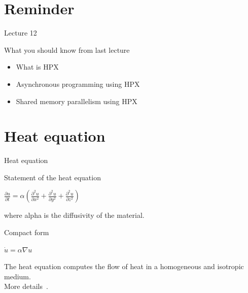 \documentclass[12pt,t]{beamer}
\title{\coursename}
\subtitle{Lecture 12: One-dimensional heat equation}
\date {
 \tiny \url{\courseurl}
\vspace{2cm}
\doclicenseThis  
  
}
\begin{document}
 {
    \frame {
        \titlepage
    }
}

\frame{

\tableofcontents

}


\section{Reminder}
\begin{frame}{Lecture 12}
\begin{block}{What you should know from last lecture}
\begin{itemize}
\item What is HPX
\item Asynchronous programming using HPX
\item Shared memory parallelism using HPX
\end{itemize}
\end{block}
\end{frame}

\section{Heat equation}

\begin{frame}{Heat equation}

\begin{block}{Statement of the heat equation}
\begin{center}
$\frac{\partial u}{\partial t} = \alpha \left( \frac{\partial^2 u }{\partial x^2} + \frac{\partial^2 u}{\partial y^2} + \frac{\partial^2 u}{\partial z^2} \right)$
\end{center}
where alpha is the diffusivity of the material. 
\end{block}

\begin{block}{Compact form}
\begin{center}
$ \dot u = \alpha \nabla u$
\end{center}
\end{block}
The heat equation computes the flow of heat in a homogeneous and isotropic medium.\\
\vspace{0.25cm}
More details~\cite{cannon1984one}.

\end{frame}
\end{document}
